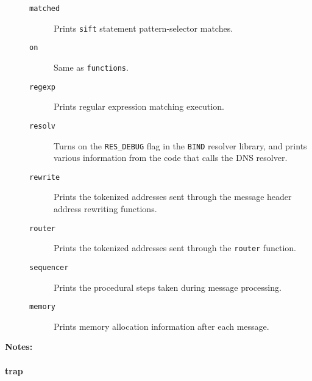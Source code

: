\begin{description}
\begin{description}
\item[{\tt matched}] \mbox{}

Prints {\tt sift} statement 
pattern-selector matches. 

\item[{\tt on}] \mbox{}

Same as {\tt functions}. 

\item[{\tt regexp}] \mbox{}

Prints regular expression matching execution. 

\item[{\tt resolv}] \mbox{}

Turns on the {\tt RES\_DEBUG} flag in the 
{\tt BIND} resolver library, and prints various information 
from the code that calls the DNS resolver. 

\item[{\tt rewrite}] \mbox{}

Prints the tokenized addresses sent through 
the message header address rewriting functions. 

\item[{\tt router}] \mbox{}

Prints the tokenized addresses sent through 
the {\tt router} function. 

\item[{\tt sequencer}] \mbox{}

Prints the procedural steps taken during 
message processing. 

\item[{\tt memory}] \mbox{}

Prints memory allocation information after 
each message. 

\end{description}


\item[{\bf Notes:}] \mbox{}

 

\end{description}


\vspace {2pt}


\paragraph{trap}

